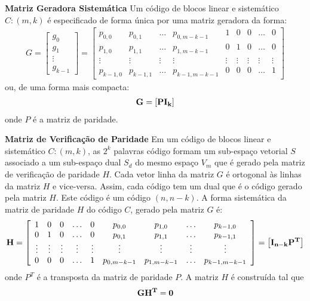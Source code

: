 \begin{definition} {\bf Matriz Geradora Sistemática} \label{matger}   Um código de blocos linear e sistemático $C:(m,k)$ é especificado de forma única por uma matriz geradora da forma:
\begin{align*}
G=\left[\begin{array}{c}
g_0\\
g_1\\
\vdots\\
g_{k-1}
\end{array}\right]=
\left[\begin{array}{ccccccccc}
p_{0,0} & p_{0,1} & \ldots & p_{0,m-k-1} & 1 & 0 & 0 & \ldots & 0 \\
p_{1,0} & p_{1,1} & \ldots & p_{1,m-k-1} & 0 & 1 & 0 & \ldots & 0\\
\vdots & \vdots & \vdots & \vdots & \vdots & \vdots & \vdots & \vdots & \vdots\\
p_{k-1,0} & p_{k-1,1} & \ldots & p_{k-1,m-k-1} & 0 & 0 & 0 & \ldots & 1
\end{array}\right]
\end{align*}
ou, de uma forma mais compacta:
\begin{align*}
{\bf G} = \left[ {\bf P I_k} \right]
\end{align*}
onde {\bf $P$} é a matriz de paridade.
\end{definition}

\begin{definition} {\bf Matriz de Verificação de Paridade} \label{matverpar}   Em um código de blocos linear e sistemático $C:(m,k)$,  as $2^k$ palavras código formam um sub-espaço vetorial $S$ associado a um sub-espaço dual $S_d$ do mesmo espaço $V_m$ que é gerado pela matriz de verificação de paridade $H$. Cada vetor linha da matriz $G$ é ortogonal às linhas da matriz $H$ e vice-versa. Assim, cada código tem um dual que é o código gerado pela matriz $H$. Este código é um código $(n, n - k)$. A forma sistemática da matriz de paridade $H$ do código $C$, gerado pela matriz $G$ é:
\begin{align*}
{\bf H} =\left[\begin{array}{ccccccccc}
1 & 0 & 0 & \ldots & 0 & p_{0,0} & p_{1,0} & \ldots & p_{k-1,0}\\
0 & 1 & 0 & \ldots & 0 & p_{0,1} & p_{1,1} & \ldots & p_{k-1,1}\\
\vdots & \vdots & \vdots & \vdots & \vdots & \vdots & \vdots & \vdots & \vdots\\
0 & 0 & 0 & \ldots & 1 & p_{0,m-k-1} & p_{1,m-k-1} & \ldots & p_{k-1,m-k-1}\\
\end{array}\right]=\left[ {\bf I_{n-k}P^T} \right]
\end{align*}
onde {\bf $P^T$} é a transposta da matriz de paridade {\bf $P$}. A matriz {\bf $H$} é construída tal que 
\begin{align*}
{\bf GH^T} = {\bf 0} 
\end{align*}
\end{definition}


